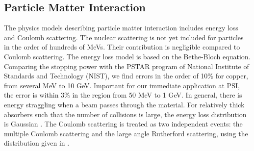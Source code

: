 \documentclass[acus]{JAC2003}
\begin{document}
\subsection{Particle Matter Interaction}
The physics models describing particle matter interaction includes energy loss and Coulomb scattering. 
The nuclear scattering is not yet included for particles in the order of  hundreds of MeVs. Their contribution 
is  negligible compared to Coulomb scattering. The energy loss model is based on the Bethe-Bloch equation. 
Comparing the stopping power with the PSTAR program of National Institute of Standards and Technology (NIST), we find
errors in the order of 10\% for copper, from several MeV to 10 GeV. Important for our immediate application at PSI, the error is within 3\% in the region from 50 MeV to 1 GeV. 
In general, there is energy straggling when a beam passes through the material. 
For relatively thick absorbers such that the number of collisions is large, the energy loss distribution is Gaussian \cite{William}. 
The Coulomb scattering is treated as two independent events: the multiple Coulomb scattering and the large angle Rutherford scattering, 
using the distribution given in \cite{Jackson}.
\end{document}

